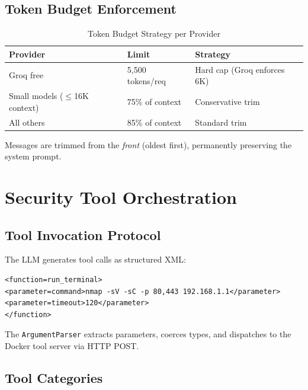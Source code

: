 \documentclass[12pt,a4paper]{article}
\begin{document}
\subsection{Token Budget Enforcement}

\begin{table}[H]
\centering
\caption{Token Budget Strategy per Provider}
\begin{tabular}{lll}
\toprule
\textbf{Provider} & \textbf{Limit} & \textbf{Strategy} \\
\midrule
Groq free & 5,500 tokens/req & Hard cap (Groq enforces 6K) \\
Small models ($\leq$16K context) & 75\% of context & Conservative trim \\
All others & 85\% of context & Standard trim \\
\bottomrule
\end{tabular}
\end{table}

Messages are trimmed from the \emph{front} (oldest first), permanently preserving the system prompt.



\section{Security Tool Orchestration}

\subsection{Tool Invocation Protocol}

The LLM generates tool calls as structured XML:

\begin{lstlisting}[caption={Tool call format}]
<function=run_terminal>
<parameter=command>nmap -sV -sC -p 80,443 192.168.1.1</parameter>
<parameter=timeout>120</parameter>
</function>
\end{lstlisting}

The \texttt{ArgumentParser} extracts parameters, coerces types, and dispatches to the Docker tool server via HTTP POST.

\subsection{Tool Categories}
\end{document}
